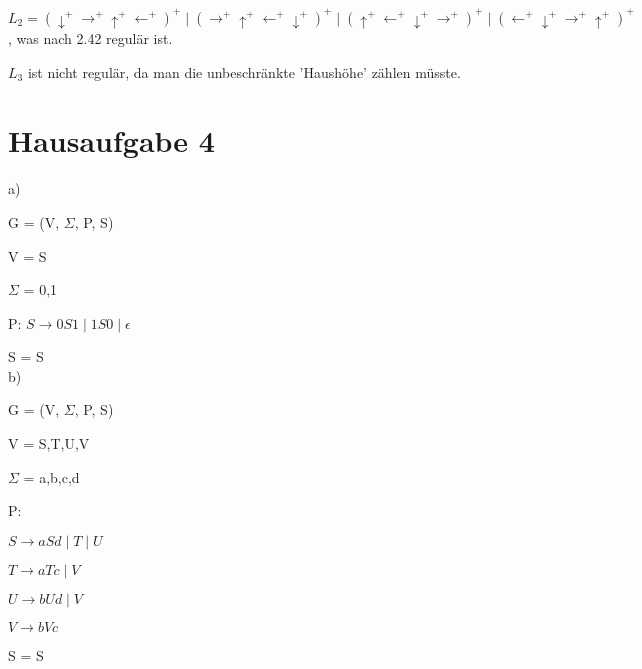 \documentclass{article}
\begin{document}
$L_{2} = (\downarrow^+\rightarrow^+\uparrow^+\leftarrow^+)^+ 
\mid (\rightarrow^+\uparrow^+\leftarrow^+\downarrow^+)^+
\mid (\uparrow^+\leftarrow^+\downarrow^+\rightarrow^+)^+
\mid (\leftarrow^+\downarrow^+\rightarrow^+\uparrow^+)^+ $, 
was nach 2.42 regulär ist.

$L_{3}$ ist nicht regulär, da man die unbeschränkte 'Haushöhe'
zählen müsste.

\section{Hausaufgabe 4}

a)

G = (V, $\Sigma$, P, S) 

V = {S} 

$\Sigma$ = {0,1} 

P: $S \rightarrow 0S1 \mid 1S0 \mid \epsilon$

S = S 
\\
b)

G = (V, $\Sigma$, P, S) 

V = {S,T,U,V} 

$\Sigma$ = {a,b,c,d} 

P:  

$S \rightarrow aSd \mid T \mid U$

$T \rightarrow aTc \mid V$

$U \rightarrow bUd \mid V$

$V \rightarrow bVc$

S = S 
\end{document}
